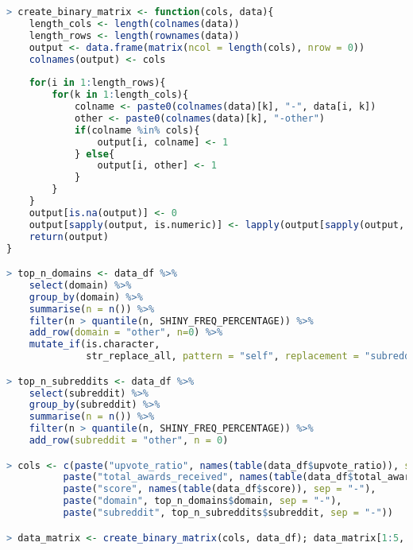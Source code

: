 \documentclass[../../main.tex]{subfiles}
\begin{document}
\begin{lstlisting}[language=R]
> create_binary_matrix <- function(cols, data){
    length_cols <- length(colnames(data))
    length_rows <- length(rownames(data))
    output <- data.frame(matrix(ncol = length(cols), nrow = 0))
    colnames(output) <- cols
    
    for(i in 1:length_rows){
        for(k in 1:length_cols){
            colname <- paste0(colnames(data)[k], "-", data[i, k])
            other <- paste0(colnames(data)[k], "-other")
            if(colname %in% cols){
                output[i, colname] <- 1
            } else{
                output[i, other] <- 1
            }
        }
    }
    output[is.na(output)] <- 0
    output[sapply(output, is.numeric)] <- lapply(output[sapply(output, is.numeric)], as.factor)
    return(output)
}

> top_n_domains <- data_df %>%
	select(domain) %>%
	group_by(domain) %>%
	summarise(n = n()) %>%
	filter(n > quantile(n, SHINY_FREQ_PERCENTAGE)) %>%
	add_row(domain = "other", n=0) %>%
	mutate_if(is.character,
			  str_replace_all, pattern = "self", replacement = "subreddit")

> top_n_subreddits <- data_df %>%
	select(subreddit) %>%
	group_by(subreddit) %>%
	summarise(n = n()) %>%
	filter(n > quantile(n, SHINY_FREQ_PERCENTAGE)) %>%
	add_row(subreddit = "other", n = 0)

> cols <- c(paste("upvote_ratio", names(table(data_df$upvote_ratio)), sep = "-"),
		  paste("total_awards_received", names(table(data_df$total_awards_received)), sep = "-"),
		  paste("score", names(table(data_df$score)), sep = "-"),
		  paste("domain", top_n_domains$domain, sep = "-"),
		  paste("subreddit", top_n_subreddits$subreddit, sep = "-"))

> data_matrix <- create_binary_matrix(cols, data_df); data_matrix[1:5, 1:5]

\end{lstlisting}

\vskip 0.2in

\begin{table}[H]
\centering
{}
\end{table}
\end{document}
